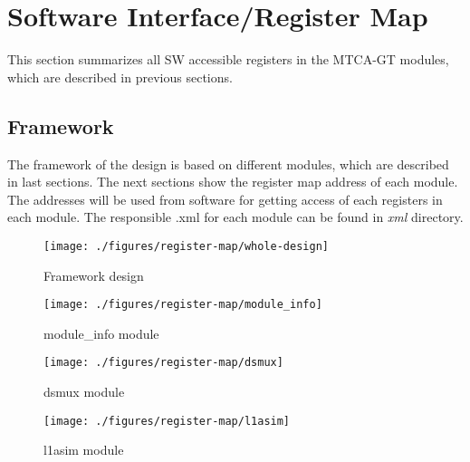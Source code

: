 
\clearpage
\section{Software Interface/Register Map}

This section summarizes  all SW accessible registers in the MTCA-GT modules, which are described in previous sections. 

\subsection {Framework}
The framework of the design is based on different modules, which are described in last sections. The next sections show the register map address of
each module. The addresses will be used from software for getting access of each registers in each module. The responsible .xml for each module can
be found in \textit{xml} directory.


\begin{figure}[ht]
  \texttt{[image: ./figures/register-map/whole-design]}
  \caption{Framework design }
  \label{fig:framework modules}
\end{figure}


\begin{figure}[ht]
  \texttt{[image: ./figures/register-map/module\_info]}
  \caption{module\_info module}
  \label{fig:Module.info modules}
\end{figure}

\begin{figure}[ht]
  \texttt{[image: ./figures/register-map/dsmux]}
  \caption{dsmux module }
  \label{fig:dsmux modules}
\end{figure}

\begin{figure}[ht]
  \texttt{[image: ./figures/register-map/l1asim]}
  \caption{l1asim module}
  \label{fig:l1asim modules}
\end{figure}

